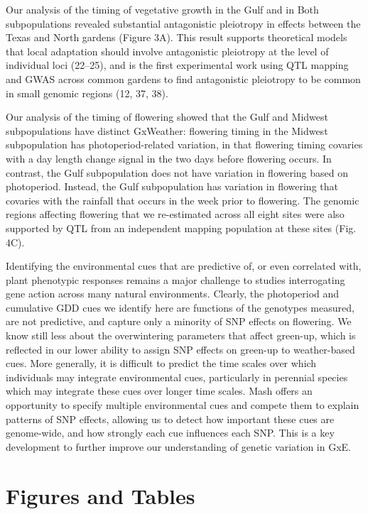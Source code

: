 \documentclass[
  9pt,
  twocolumn,
  twoside]{pnas-new}
\begin{document}
Our analysis of the timing of vegetative growth in the Gulf and in Both
subpopulations revealed substantial antagonistic pleiotropy in effects
between the Texas and North gardens (Figure 3A). This result supports
theoretical models that local adaptation should involve antagonistic
pleiotropy at the level of individual loci (22--25), and is the first
experimental work using QTL mapping and GWAS across common gardens to
find antagonistic pleiotropy to be common in small genomic regions (12,
37, 38).

Our analysis of the timing of flowering showed that the Gulf and Midwest
subpopulations have distinct GxWeather: flowering timing in the Midwest
subpopulation has photoperiod-related variation, in that flowering
timing covaries with a day length change signal in the two days before
flowering occurs. In contrast, the Gulf subpopulation does not have
variation in flowering based on photoperiod. Instead, the Gulf
subpopulation has variation in flowering that covaries with the rainfall
that occurs in the week prior to flowering. The genomic regions
affecting flowering that we re-estimated across all eight sites were
also supported by QTL from an independent mapping population at these
sites (Fig. 4C).

Identifying the environmental cues that are predictive of, or even
correlated with, plant phenotypic responses remains a major challenge to
studies interrogating gene action across many natural environments.
Clearly, the photoperiod and cumulative GDD cues we identify here are
functions of the genotypes measured, are not predictive, and capture
only a minority of SNP effects on flowering. We know still less about
the overwintering parameters that affect green-up, which is reflected in
our lower ability to assign SNP effects on green-up to weather-based
cues. More generally, it is difficult to predict the time scales over
which individuals may integrate environmental cues, particularly in
perennial species which may integrate these cues over longer time
scales. Mash offers an opportunity to specify multiple environmental
cues and compete them to explain patterns of SNP effects, allowing us to
detect how important these cues are genome-wide, and how strongly each
cue influences each SNP. This is a key development to further improve
our understanding of genetic variation in GxE.

\section{Figures and Tables}\label{figures-and-tables}
\end{document}
